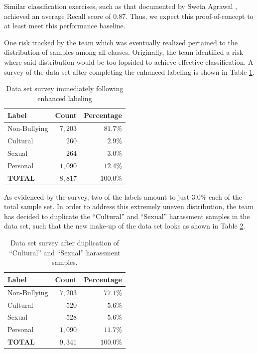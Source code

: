\documentclass[conference]{sig-alternate-05-2015}
\begin{document}
Similar classification exercises, such as that documented by Sweta Agrawal
\cite{agrawal2018deep}, achieved an average Recall score of \( 0.87 \). Thus,
we expect this proof-of-concept to at least meet this performance baseline.

One risk tracked by the team which was eventually realized pertained to the
distribution of samples among all classes. Originally, the team identified a
risk where said distribution would be too lopsided to achieve effective
classification. A survey of the data set after completing the enhanced labeling
is shown in Table \ref{tab:dataset_survey_first}.

\begin{table}[h!]
  \centering
  \begin{tabular}{| l | r | r |}
    \hline
    Label & Count & Percentage \\
    \hline\hline
    Non-Bullying & $7,203$ & $81.7$\% \\
    \hline
    Cultural & $260$ & $2.9$\% \\
    \hline
    Sexual & $264$ & $3.0$\% \\
    \hline
    Personal & $1,090$ & $12.4$\% \\
    \hline\hline
    \textbf{TOTAL} & $8,817$ & $100.0$\% \\
    \hline
  \end{tabular}
  \caption{Data set survey immediately following enhanced labeling}
  \label{tab:dataset_survey_first}
\end{table}

As evidenced by the survey, two of the labels amount to just $3.0$\% each of the
total sample set. In order to address this extremely uneven distribution, the
team has decided to duplicate the ``Cultural'' and ``Sexual'' harassment samples
in the data set, such that the new make-up of the data set looks as shown in
Table \ref{tab:dataset_survey_final}.

\begin{table}[h!]
  \centering
  \begin{tabular}{| l | r | r |}
    \hline
    Label & Count & Percentage \\
    \hline\hline
    Non-Bullying & $7,203$ & $77.1$\% \\
    \hline
    Cultural & $520$ & $5.6$\% \\
    \hline
    Sexual & $528$ & $5.6$\% \\
    \hline
    Personal & $1,090$ & $11.7$\% \\
    \hline\hline
    \textbf{TOTAL} & $9,341$ & $100.0$\% \\
    \hline
  \end{tabular}
  \caption{Data set survey after duplication of ``Cultural'' and ``Sexual''
  harassment samples.}
  \label{tab:dataset_survey_final}
\end{table}
\end{document}
